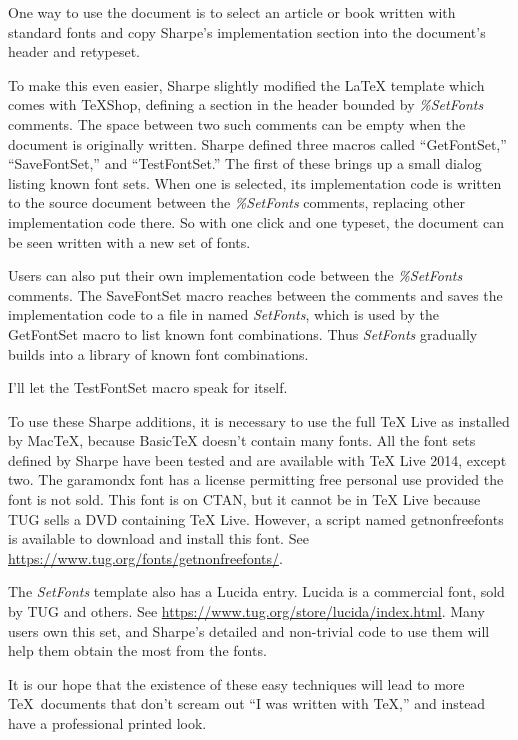 \documentclass[11pt, oneside]{amsart}
\begin{document}
One way to use the document is to select an article or book written with standard fonts and  copy Sharpe's implementation section into the document's header and retypeset. 

To make this even easier, Sharpe slightly modified the LaTeX template which comes with TeXShop, 
defining a  section in the header bounded by {\em \%SetFonts} comments. The space between two such comments can be empty when the document is originally written.  Sharpe defined three
macros called ``GetFontSet,'' ``SaveFontSet,'' and ``TestFontSet.'' The first of these brings up
a small dialog listing known font sets. When one is selected, its implementation code is written to the source document between the {\em \%SetFonts} comments, replacing other implementation code there. So with one click and one typeset, the document can be seen written with a new set of fonts.

Users can also put their own implementation code between the  {\em \%SetFonts} comments.
The SaveFontSet macro reaches between the comments and saves the implementation code to a file in  named {\em SetFonts}, which is used by the GetFontSet macro to list known font combinations. Thus {\em SetFonts}  gradually builds into a library of known font combinations.

I'll let the TestFontSet macro speak for itself.

To use these Sharpe additions, it is necessary to use the full TeX Live as installed by MacTeX,
because BasicTeX doesn't contain many fonts. All the font sets defined by Sharpe have been
tested and are available with TeX Live 2014, except two. The garamondx font has a license permitting free personal use provided the font is not sold. This font is on CTAN, but it cannot
be in TeX Live because TUG sells a DVD containing TeX Live. However, a script named getnonfreefonts is available to download and install this font. See \url{https://www.tug.org/fonts/getnonfreefonts/}.

The {\em SetFonts} template also has a Lucida entry. Lucida is a commercial font, sold by TUG and others. 
See \url{https://www.tug.org/store/lucida/index.html}. Many users own this set, and Sharpe's detailed and non-trivial code to use them will help them obtain the most from the fonts.

It is our hope that the existence of these easy techniques will lead to more \TeX\ documents that don't scream out ``I was written with \TeX,'' and instead have a professional printed look.
\end{document}
